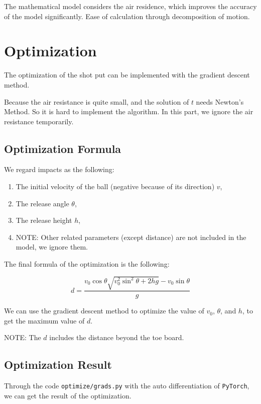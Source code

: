 \documentclass{article}
\begin{document}
The mathematical model considers the air residence, which improves the accuracy of the model significantly. Ease of calculation through decomposition of motion.

\section{Optimization}

The optimization of the shot put can be implemented with the gradient descent method.

Because the air resistance is quite small, and the solution of $t$ needs Newton's Method. So it is hard to implement the algorithm. In this part, we ignore the air resistance temporarily.

\subsection{Optimization Formula}

We regard impacts as the following:

\begin{enumerate}
    \item The initial velocity of the ball (negative because of its direction) $v$,
    \item The release angle $\theta$,
    \item The release height $h$,
    \item NOTE: Other related parameters (except distance) are not included in the model, we ignore them.
\end{enumerate}

The final formula of the optimization is the following:

\begin{equation}
    d = \dfrac{v_0\cos\theta\sqrt{v_0^2\sin^2\theta+2hg}-v_0\sin\theta}{g}
\end{equation}

We can use the gradient descent method to optimize the value of $v_0$, $\theta$, and $h$, to get the maximum value of $d$.

NOTE: The $d$ includes the distance beyond the toe board.

\subsection{Optimization Result}

Through the code \texttt{optimize/grads.py} with the auto differentiation of \texttt{PyTorch}, we can get the result of the optimization.
\end{document}
